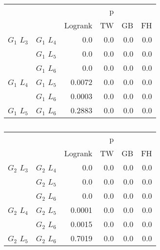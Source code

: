         
      

      \begin{table}
        \centering
        \begin{tabular}{llrrrr}
          \toprule
                       &             &         &  p &    &     \\
          \cmidrule{3-6}
                       &             & Logrank & TW & GB & FH  \\
          \midrule
          $G_1$ $L_3$  & $G_1$ $L_4$  &  0.0 &  0.0 &  0.0 &  0.0     \\
                       & $G_1$ $L_5$  & 0.0 & 0.0 & 0.0 & 0.0    \\
                       & $G_1$ $L_6$  & 0.0 & 0.0 & 0.0 & 0.0      \\
          $G_1$ $L_4$  & $G_1$ $L_5$  & 0.0072 & 0.0 & 0.0 & 0.0      \\
                       & $G_1$ $L_6$  & 0.0003 & 0.0 & 0.0 & 0.0       \\
          $G_1$ $L_5$   & $G_1$ $L_6$ & 0.2883 &  0.0 & 0.0 & 0.0      \\
          \bottomrule
        \end{tabular}
        \label{tab:g1_ingroup_tests_disp}
        \caption{}
      \end{table}


      \begin{table}
        \centering
        \begin{tabular}{llrrrr}
          \toprule
                       &             &         &  p &    &     \\
          \cmidrule{3-6}
                       &             & Logrank & TW & GB & FH  \\
          \midrule
          $G_2$ $L_3$  & $G_2$ $L_4$  &  0.0 &  0.0 &  0.0 &  0.0     \\
                       & $G_2$ $L_5$  & 0.0 & 0.0 & 0.0 & 0.0    \\
                       & $G_2$ $L_6$  & 0.0 & 0.0 & 0.0 & 0.0      \\
          $G_2$ $L_4$  & $G_2$ $L_5$  & 0.0001 & 0.0 & 0.0 & 0.0      \\
                       & $G_2$ $L_6$  & 0.0015 & 0.0 & 0.0 & 0.0       \\
          $G_2$ $L_5$   & $G_2$ $L_6$ & 0.7019 &  0.0 & 0.0 & 0.0      \\
          \bottomrule
        \end{tabular}
        \label{tab:g2_ingroup_tests_disp}
        \caption{}
      \end{table}



